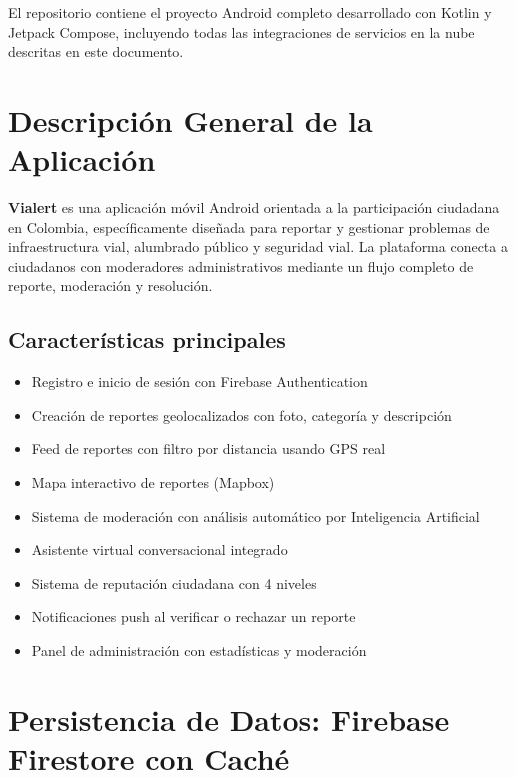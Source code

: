 \documentclass[12pt,a4paper]{article}
\begin{document}
El repositorio contiene el proyecto Android completo desarrollado con Kotlin y Jetpack Compose, incluyendo todas las integraciones de servicios en la nube descritas en este documento.

\section{Descripción General de la Aplicación}

\textbf{Vialert} es una aplicación móvil Android orientada a la participación ciudadana en Colombia, específicamente diseñada para reportar y gestionar problemas de infraestructura vial, alumbrado público y seguridad vial. La plataforma conecta a ciudadanos con moderadores administrativos mediante un flujo completo de reporte, moderación y resolución.

\subsection{Características principales}
\begin{itemize}[leftmargin=1.5em]
    \item Registro e inicio de sesión con Firebase Authentication
    \item Creación de reportes geolocalizados con foto, categoría y descripción
    \item Feed de reportes con filtro por distancia usando GPS real
    \item Mapa interactivo de reportes (Mapbox)
    \item Sistema de moderación con análisis automático por Inteligencia Artificial
    \item Asistente virtual conversacional integrado
    \item Sistema de reputación ciudadana con 4 niveles
    \item Notificaciones push al verificar o rechazar un reporte
    \item Panel de administración con estadísticas y moderación
\end{itemize}

\section{Persistencia de Datos: Firebase Firestore con Caché}
\end{document}
